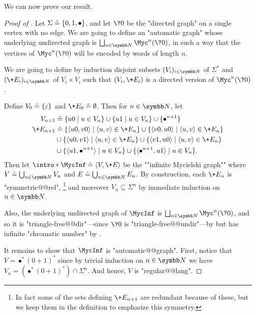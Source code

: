 We can now prove our result.

\begin{proof}[Proof of ]
  Let $\Sigma \mathrel{\hat{=}} \{0,1,\bullet\}$, and let $\?0$ be the "directed
  graph" on a single vertex with no edge.
  We are going to define an "automatic graph" whose underlying undirected graph
  is $\bigdcup_{n\in\N} \Myc^n(\?0)$, in such a way that the vertices of $\Myc^n(\?0)$
  will be encoded by words of length $n$.

  We are going to define by induction
  disjoint subsets $(V_i)_{i\in\N}$ of $\Sigma^*$
  and $(\+E_i)_{i\in\N}$ of $V_i \times V_i$ such that
  $(V_i, \+E_i)$ is a directed version of $\Myc^n(\?0)$.

  Define $V_0 \mathrel{\hat{=}} \{\varepsilon\}$ and $\+E_0 \defeq \emptyset$.
  Then for $n \in \N$, let
  \begin{align*}
    V_{n+1} & \defeq \{u0\mid u \in V_n\}\cup \{u1\mid u \in V_n\}\cup\{\bullet^{n+1}\}\\
    \+E_{n+1} & \defeq \{\langle u0,v0\rangle \mid \langle u,v\rangle \in \+E_n\}
		\cup \{\langle v0,u0\rangle \mid \langle u,v\rangle \in \+E_n\} \\
		& \cup \{\langle u0,v1\rangle \mid \langle u,v\rangle \in \+E_n\}
		\cup \{\langle v1,u0\rangle \mid \langle u,v\rangle \in \+E_n\} \\
    	& \cup \{\langle u1, \bullet^{n+1}\rangle \mid u\in V_n\}
		\cup \{\langle \bullet^{n+1}, u1\rangle \mid u\in V_n\}.
  \end{align*}
  Then let \AP$\intro*\MycInf \defeq \tup{V, \+E}$ be
  the ""infinite Mycielski graph"" where $V \defeq \bigcup_{n\in \N} V_n$
  and $E \defeq \bigcup_{n\in \N} E_n$.
  By construction, each $\+E_n$ is "symmetric@@rel",%
  \footnote{In fact some of the sets defining $\+E_{n+1}$ are redundant because of these,
  but we keep them in the definition to emphasize this symmetry.}
  and moreover $V_n \subseteq \Sigma^n$ by immediate induction on $n\in\N$.

  Also, the underlying undirected graph of $\MycInf$ is
  $\bigdcup_{n\in\N} \Myc^n(\?0)$, and so it is "triangle-free@@dir"---since $\?0$ is "triangle-free@@undir"---by  but has infinite
  "chromatic number" by . 
  
  It remains to show that $\MycInf$ is "automatic@@graph".
  First, notice that $V = \bullet^*(0+1)^*$ since by trivial induction
  on $n\in\N$ we have $V_n = (\bullet^*(0+1)^*)\cap \Sigma^n$. And hence,
  $V$ is "regular@@lang".


\end{proof}
